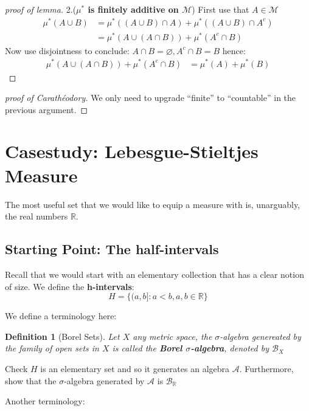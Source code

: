 \documentclass[a4paper,11pt,oneside]{book}
\newtheorem{definition}{Definition}[section]
\begin{document}
\begin{proof}[proof of lemma]
2.(\textbf{$\mu^{*}$ is finitely additive on $\mathcal M$})
First use that $A\in \mathcal M$
\begin{equation}
\begin{aligned}
\mu^*(A\cup B) &= \mu^*((A\cup B)\cap A) +  \mu^*((A\cup B)\cap A^c) \\
&= \mu^*(A\cup (A\cap B))  +  \mu^*(A^c \cap B)
\end{aligned}
\end{equation}
Now use disjointness to conclude: $A\cap B=\varnothing, A^c \cap B = B$ hence:
\begin{equation}
\begin{aligned}
\mu^*(A\cup (A\cap B))  +  \mu^*(A^c \cap B) &= \mu^*(A)+\mu^*(B)
\end{aligned}
\end{equation}

\end{proof}\begin{proof}[proof of Carathéodory]We only need to upgrade ``finite'' to ``countable'' in the previous argument.

\end{proof}\section{Casestudy: Lebesgue-Stieltjes Measure}

The most useful set that we would like to equip a measure with is, unarguably, the real numbers $\mathbb{R}$.

\subsection{Starting Point: The half-intervals}

Recall that we would start with an elementary collection that has a clear notion of size. We define the \textbf{h-intervals}:
\begin{equation}
H=\{(a,b]:a<b, a,b\in \mathbb{R}\}
\end{equation}

We define a terminology here:

\begin{definition}[Borel Sets]Let $X$ any metric space, the $\sigma$-algebra genereated by the family of open sets in $X$ is called the \textbf{Borel $\sigma$-algebra}, denoted by $\mathcal B_{X}$

\end{definition}\begin{mystexercise}\label{exercise-MoIMrRn4Uy}\label{exercise-moimrrn4uy}Check $H$ is an elementary set and so it generates an algebra $\mathcal A$. Furthermore, show that the $\sigma$-algebra generated by $\mathcal A$ is   $\mathcal B_{\mathbb{R}}$

\end{mystexercise}
Another terminology:
\end{document}
